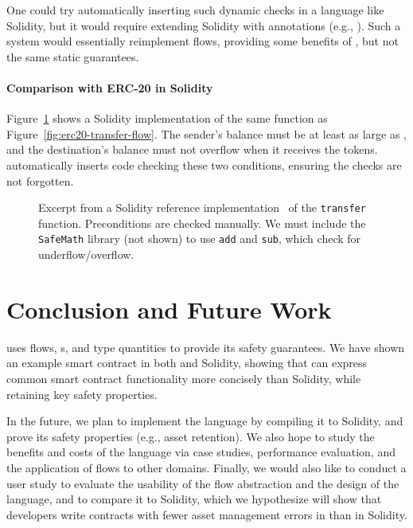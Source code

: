 \documentclass[dvipsnames,runningheads]{llncs}
\begin{document}
One could try automatically inserting such dynamic checks in a language like Solidity, but it would require extending Solidity with annotations (e.g., ).
Such a system would essentially reimplement flows, providing some benefits of \langName, but not the same static guarantees.

\paragraph{\textbf{Comparison with ERC-20 in Solidity}}\label{sec:erc20-impl}
Figure~\ref{fig:erc20-transfer-sol} shows a Solidity implementation of the same function as Figure~\ref{fig:erc20-transfer-flow}.
The sender's balance must be at least as large as , and the destination's balance must not overflow when it receives the tokens.
\langName automatically inserts code checking these two conditions, ensuring the checks are not forgotten.
\begin{figure}
    \vspace{-2em}
    \centering
    
    \vspace{-1em}
    \caption{Excerpt from a Solidity reference implementation~\cite{erc20Consensys} of the \lstinline[language=Solidity]{transfer} function.
        Preconditions are checked manually.
        We must include the \lstinline[language=Solidity]{SafeMath} library (not shown) to use \lstinline[language=Solidity]{add} and \lstinline[language=Solidity]{sub}, which check for underflow/overflow.}
    \label{fig:erc20-transfer-sol}
    \vspace{-2em}
\end{figure}

\section{Conclusion and Future Work}

\langName uses flows, \assetTxt{}s, and type quantities to provide its safety guarantees.
We have shown an example smart contract in both \langName and Solidity, showing that \langName can express common smart contract functionality more concisely than Solidity, while retaining key safety properties.

In the future, we plan to implement the \langName language by compiling it to Solidity, and prove its safety properties (e.g., asset retention).
We also hope to study the benefits and costs of the language via case studies, performance evaluation, and the application of flows to other domains.
Finally, we would also like to conduct a user study to evaluate the usability of the flow abstraction and the design of the language, and to compare it to Solidity, which we hypothesize will show that developers write contracts with fewer asset management errors in \langName than in Solidity.



\end{document}
